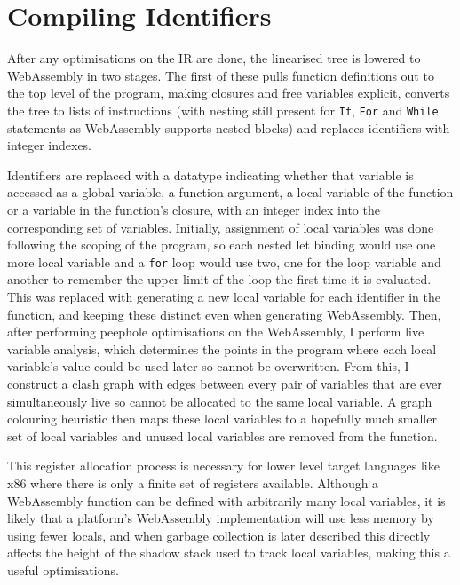\section{Compiling Identifiers}
After any optimisations on the IR are done, the linearised tree is lowered to WebAssembly in two stages. The first of these pulls function definitions out to the top level of the program, making closures and free variables explicit, converts the tree to lists of instructions (with nesting still present for \verb|If|, \verb|For| and \verb|While| statements as WebAssembly supports nested blocks) and replaces identifiers with integer indexes.

Identifiers are replaced with a datatype indicating whether that variable is accessed as a global variable, a function argument, a local variable of the function or a variable in the function's closure, with an integer index into the corresponding set of variables. Initially, assignment of local variables was done following the scoping of the program, so each nested let binding would use one more local variable and a \verb|for| loop would use two, one for the loop variable and another to remember the upper limit of the loop the first time it is evaluated. \\
This was replaced with generating a new local variable for each identifier in the function, and keeping these distinct even when generating WebAssembly. Then, after performing peephole optimisations on the WebAssembly, I perform live variable analysis, which determines the points in the program where each local variable's value could be used later so cannot be overwritten. From this, I construct a clash graph with edges between every pair of variables that are ever simultaneously live so cannot be allocated to the same local variable. A graph colouring heuristic then maps these local variables to a hopefully much smaller set of local variables and unused local variables are removed from the function. %

This register allocation process is necessary for lower level target languages like x86 where there is only a finite set of registers available. Although a WebAssembly function can be defined with arbitrarily many local variables, it is likely that a platform's WebAssembly implementation will use less memory by using fewer locals, and when garbage collection is later described this directly affects the height of the shadow stack used to track local variables, making this a useful optimisations.

